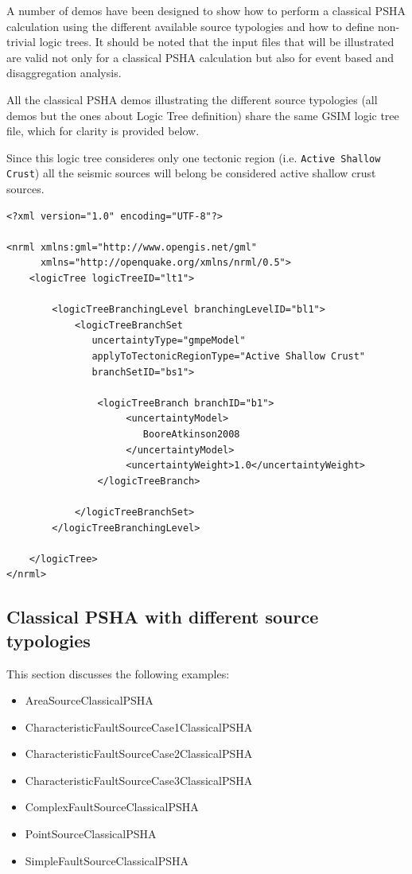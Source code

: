 A number of demos have been designed to show how to perform a classical PSHA
calculation using the different available source typologies and how to define
non-trivial logic trees. It should be  noted that the input files that will be
illustrated are valid not only for a classical PSHA calculation but also for
event based and  disaggregation analysis.

All the classical PSHA demos illustrating the different source typologies
(all demos but the ones about Logic Tree definition) share the same GSIM logic
tree file, which for clarity is provided below.

Since this logic tree consideres only one tectonic region (i.e. \texttt{Active
Shallow Crust}) all the seismic sources will belong be considered active
shallow crust sources.

\begin{Verbatim}[frame=single, commandchars=\\\{\}, fontsize=\normalsize]
<?xml version="1.0" encoding="UTF-8"?>

<nrml xmlns:gml="http://www.opengis.net/gml"
      xmlns="http://openquake.org/xmlns/nrml/0.5">
    <logicTree logicTreeID="lt1">

        <logicTreeBranchingLevel branchingLevelID="bl1">
            <logicTreeBranchSet
               uncertaintyType="gmpeModel"
               applyToTectonicRegionType="Active Shallow Crust"
               branchSetID="bs1">

                <logicTreeBranch branchID="b1">
                     <uncertaintyModel>
                        BooreAtkinson2008
                     </uncertaintyModel>
                     <uncertaintyWeight>1.0</uncertaintyWeight>
                </logicTreeBranch>

            </logicTreeBranchSet>
        </logicTreeBranchingLevel>

    </logicTree>
</nrml>
\end{Verbatim}

\subsection{Classical PSHA with different source typologies}

This section discusses the following examples:

\begin{itemize}
    \item AreaSourceClassicalPSHA
    \item CharacteristicFaultSourceCase1ClassicalPSHA
    \item CharacteristicFaultSourceCase2ClassicalPSHA
    \item CharacteristicFaultSourceCase3ClassicalPSHA
    \item ComplexFaultSourceClassicalPSHA
    \item PointSourceClassicalPSHA
    \item SimpleFaultSourceClassicalPSHA
\end{itemize}

